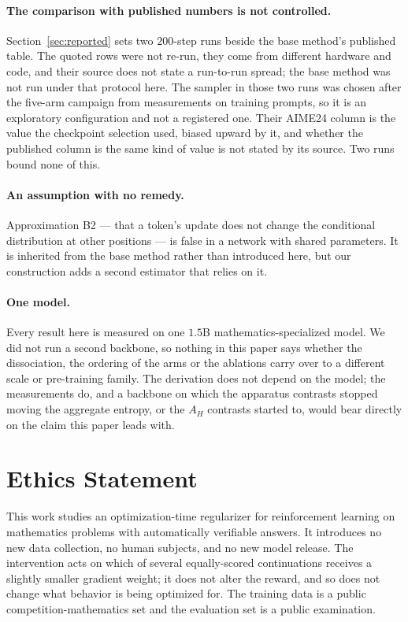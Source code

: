 \documentclass[11pt]{article}
\newcommand{\AH}{A_{H}}
\begin{document}
\paragraph{The comparison with published numbers is not controlled.}
Section~\ref{sec:reported} sets two $200$-step runs beside the base method's
published table. The quoted rows were not re-run, they come from different hardware
and code, and their source does not state a run-to-run spread; the base method was
not run under that protocol here. The sampler in those two runs was chosen after the
five-arm campaign from measurements on training prompts, so it is an exploratory
configuration and not a registered one. Their AIME24 column is the value the
checkpoint selection used, biased upward by it, and whether the published column is
the same kind of value is not stated by its source. Two runs bound none of this.

\paragraph{An assumption with no remedy.}
Approximation B2 --- that a token's update does not change the conditional
distribution at other positions --- is false in a network with shared parameters.
It is inherited from the base method rather than introduced here, but our
construction adds a second estimator that relies on it.

\paragraph{One model.}
Every result here is measured on one $1.5$B mathematics-specialized model. We did
not run a second backbone, so nothing in this paper says whether the dissociation,
the ordering of the arms or the ablations carry over to a different scale or
pre-training family. The derivation does not depend on the model; the measurements
do, and a backbone on which the apparatus contrasts stopped moving the aggregate
entropy, or the $\AH$ contrasts started to, would bear directly on the claim this
paper leads with.

\section*{Ethics Statement}

This work studies an optimization-time regularizer for reinforcement learning on
mathematics problems with automatically verifiable answers. It introduces no new
data collection, no human subjects, and no new model release. The intervention acts
on which of several equally-scored continuations receives a slightly smaller
gradient weight; it does not alter the reward, and so does not change what behavior
is being optimized for. The training data is a public competition-mathematics set
and the evaluation set is a public examination.
\end{document}
